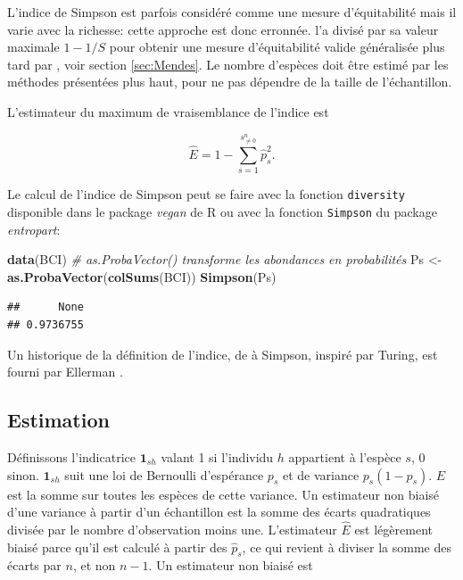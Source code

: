 \documentclass[
  11pt,
  french,
  a4paper,
  extrafontsizes,onecolumn,openright
  ]{memoir}
\newenvironment{Shaded}{\begin{snugshade}}{\end{snugshade}}
\newcommand{\CommentTok}[1]{\textcolor[rgb]{0.56,0.35,0.01}{\textit{#1}}}
\newcommand{\KeywordTok}[1]{\textcolor[rgb]{0.13,0.29,0.53}{\textbf{#1}}}
\newcommand{\NormalTok}[1]{#1}
\newcommand{\StringTok}[1]{\textcolor[rgb]{0.31,0.60,0.02}{#1}}
\begin{document}
L'indice de Simpson est parfois considéré comme une mesure d'équitabilité \autocite{Olszewski2004} mais il varie avec la richesse: cette approche est donc erronnée.
\textcite{Hurlbert1971} l'a divisé par sa valeur maximale \(1-{1}/{S}\) pour obtenir une mesure d'équitabilité valide généralisée plus tard par \textcite{Mendes2008}, voir section \ref{sec:Mendes}.
Le nombre d'espèces doit être estimé par les méthodes présentées plus haut, pour ne pas dépendre de la taille de l'échantillon.

L'estimateur du maximum de vraisemblance de l'indice est

\begin{equation}
  \label{eq:EstEML}
  \hat{E} = 1-\sum^{s^{n}_{\ne 0}}_{s=1}{\hat{p}^2_s}.
\end{equation}

Le calcul de l'indice de Simpson peut se faire avec la fonction \texttt{diversity} disponible dans le package \emph{vegan} de R ou avec la fonction \texttt{Simpson} du package \emph{entropart}:

\scriptsize

\begin{Shaded}
\begin{Highlighting}[]
\KeywordTok{data}\NormalTok{(BCI)}
\CommentTok{# as.ProbaVector() transforme les abondances en probabilités}
\NormalTok{Ps <-}\StringTok{ }\KeywordTok{as.ProbaVector}\NormalTok{(}\KeywordTok{colSums}\NormalTok{(BCI))}
\KeywordTok{Simpson}\NormalTok{(Ps)}
\end{Highlighting}
\end{Shaded}

\begin{verbatim}
##      None 
## 0.9736755
\end{verbatim}

\normalsize

Un historique de la définition de l'indice, de \textcite{Gini1912} à Simpson, inspiré par Turing, est fourni par Ellerman \autocite*{Ellerman2013}.

\hypertarget{estimation}{%
\subsection{Estimation}\label{estimation}}

Définissons l'indicatrice \({{\mathbf 1}}_{sh}\) valant 1 si l'individu \(h\) appartient à l'espèce \(s\), 0 sinon.
\({{\mathbf 1}}_{sh}\) suit une loi de Bernoulli d'espérance \(p_s\) et de variance \(p_s\left(1-p_s\right)\).
\(E\) est la somme sur toutes les espèces de cette variance.
Un estimateur non biaisé d'une variance à partir d'un échantillon est la somme des écarts quadratiques divisée par le nombre d'observation moins une.
L'estimateur \(\hat{E}\) est légèrement biaisé parce qu'il est calculé à partir des \({\hat{p}}_s\), ce qui revient à diviser la somme des écarts par \(n\), et non \(n-1\).
Un estimateur non biaisé est \autocite{Good1953,Lande1996}
\end{document}
